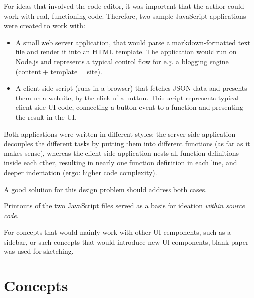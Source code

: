 For ideas that involved the code editor, it was important that the
author could work with real, functioning code. Therefore, two sample
JavaScript applications were created to work with:

\begin{itemize}
\itemsep1pt\parskip0pt
\item
  A small web server application, that would parse a markdown-formatted
  text file and render it into an HTML template. The application would
  run on Node.js and represents a typical control flow for e.g. a
  blogging engine (content + template = site).
\item
  A client-side script (runs in a browser) that fetches JSON data and
  presents them on a website, by the click of a button. This script
  represents typical client-side UI code, connecting a button event to a
  function and presenting the result in the UI.
\end{itemize}

Both applications were written in different styles: the server-side
application decouples the different tasks by putting them into different
functions (as far as it makes sense), whereas the client-side
application nests all function definitions inside each other, resulting
in nearly one function definition in each line, and deeper indentation
(ergo: higher code complexity).

A good solution for this design problem should address both cases.

Printouts of the two JavaScript files served as a basis for ideation
\emph{within source code}.

For concepts that would mainly work with other UI components, such as a
sidebar, or such concepts that would introduce new UI components, blank
paper was used for sketching.

\section{Concepts}\label{concepts}

